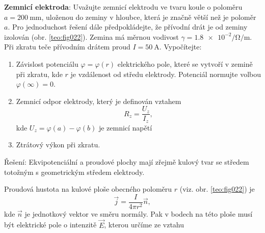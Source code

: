 \begin{mdframed}[style=mdexam]
  \begin{example}\label{TEO:exam011}
    \textbf{Zemnicí elektroda}: Uvažujte zemnicí elektrodu ve tvaru koule o poloměru
    $a=\SI{200}{\mm}$, uloženou do zeminy v hloubce, která je značně větší než je poloměr $a$. Pro
    jednoduchost řešení dále předpokládejte, že přívodní drát je od zeminy izolován (obr.
    \ref{teo:fig022}). Zemina má měrnou vodivost $\gamma=\num[exponent-product =
    \cdot]{1,8e-2}\si{\per\ohm\per\m}$. Při zkratu teče přívodním drátem proud $I=\SI{50}{\A}$.
    Vypočítejte:




    \begin{enumerate}[label=\emph{\alph*}),noitemsep]
      \item Závislost potenciálu $\varphi=\varphi(r)$ elektrického pole, které se vytvoří v
            zemině při zkratu, kde $r$ je vzdálenost od středu elektrody. Potenciál normujte
            volbou $\varphi(\infty)=0$.
      \item Zemnicí odpor elektrody, který je definován vztahem
            $$R_z=\frac{U_z}{I_z},$$ kde $U_z = \varphi(a)-\varphi(b)$ je zemnicí napětí 
      \item Ztrátový výkon při zkratu.
    \end{enumerate}
    Řešení: Ekvipotenciální a proudové plochy mají zřejmě kulový tvar se středem totožným s
    geometrickým středem elektrody. 

    {\centering
    \captionsetup{type=figure}
    \label{teo:fig022}
    \par}


    Proudová hustota na kulové ploše obecného poloměru $r$ (viz. obr. \ref{teo:fig022}) je
    $$\vec{j}=\frac{I}{4\pi r^2}\vec{n},$$ kde $\vec{n}$ je jednotkový vektor ve směru normály. Pak
    v bodech na této ploše musí být elektrické pole o intenzitě $\vec{E}$, kterou určíme ze vztahu


\end{example}
\end{mdframed}
